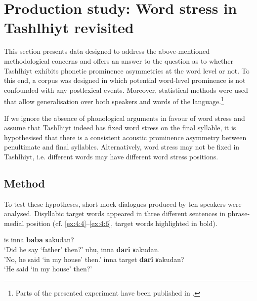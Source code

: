 \section{Production study: Word stress in Tashlhiyt revisited}\label{sec:4.3}
This section presents data designed to address the above-mentioned methodological concerns and offers an answer to the question as to whether Tashlhiyt exhibits phonetic prominence asymmetries at the word level or not. To this end, a corpus was designed in which potential word-level prominence is not confounded with any postlexical events. Moreover, statistical methods were used that allow generalisation over both speakers and words of the language.\footnote{Parts of the presented experiment have been published in \citet{Roettger.etal2015}.}

If we ignore the absence of phonological arguments in favour of word stress and assume that Tashlhiyt indeed has fixed word stress on the final syllable, it is hypothesised that there is a consistent acoustic prominence asymmetry between penultimate and final syllables. Alternatively, word stress may not be fixed in Tashlhiyt, i.e. different words may have different word stress positions.

\subsection{Method}
To test these hypotheses, short mock dialogues produced by ten speakers were analysed. Disyllabic target words appeared in three different sentences in phrase-medial position (cf. \ref{ex:4:4}--\ref{ex:4:6}, target words highlighted in bold). 

\begin{exe}
\ex\label{ex:4:4} is inna \textbf{baba} ʁakudan? \\
‘Did he say ‘father’ then?’
\ex\label{ex:4:5} uhu, inna \textbf{dari} ʁakudan. \\
'No, he said ‘in my house’ then.’
\ex\label{ex:4:6} inna target \textbf{dari} ʁakudan? \\
‘He said ‘in my house’ then?’
\end{exe} 

